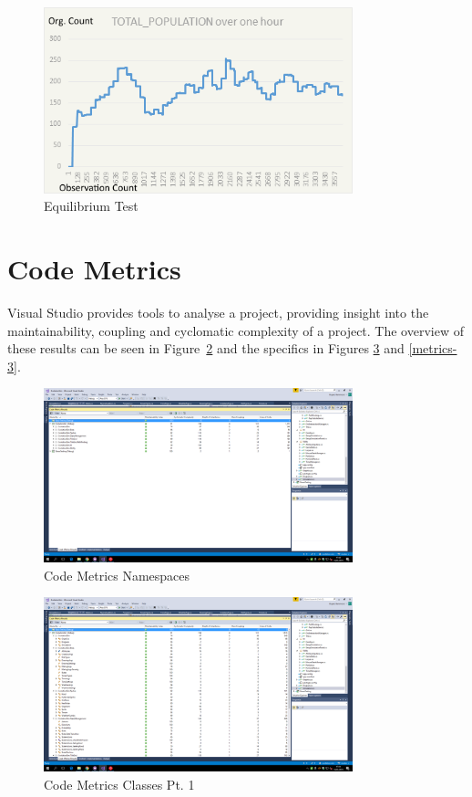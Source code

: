 \documentclass[a4paper, oneside, 11pt]{report}
\begin{document}
\begin{figure}[H]
	\caption{Equilibrium Test}\label{equilibrium-test}
	\centering
	\includegraphics[width=0.8\textwidth]{equilibrium-test}
\end{figure}
	
\section{Code Metrics}
Visual Studio provides tools to analyse a project, providing insight into the maintainability, coupling and cyclomatic complexity of a project. The overview of these results can be seen in Figure~\ref{metrics-1} and the specifics in Figures \ref{metrics-2} and \ref{metrics-3}.

\begin{figure}[H]
	\caption{Code Metrics Namespaces}\label{metrics-1}
	\centering
	\includegraphics[width=0.8\textwidth]{metrics-1}
\end{figure}

\begin{figure}[H]
\caption{Code Metrics Classes Pt. 1}\label{metrics-2}
\centering
\includegraphics[width=0.8\textwidth]{metrics-2}
\end{figure}
\end{document}
